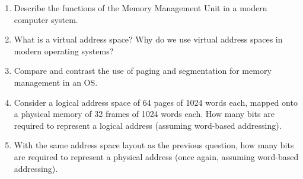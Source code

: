 \documentclass[paper=usletter, fontsize=12pt]{article}
\begin{document}
    \documentinfo{\today}

    \begin{enumerate}

        \item Describe the functions of the Memory Management Unit in a modern
        computer system.

        \item What is a virtual address space? Why do we use virtual address
        spaces in modern operating systems?

        \item Compare and contrast the use of paging and segmentation for
        memory management in an OS.

        \item Consider a logical address space of 64 pages of 1024 words each,
        mapped onto a physical memory of 32 frames of 1024 words each. How many
        bits are required to represent a logical address (assuming word-based
        addressing).

        \item With the same address space layout as the previous question, how
        many bits are required to represent a physical address (once again,
        assuming word-based addressing).

    \end{enumerate}
\end{document}
